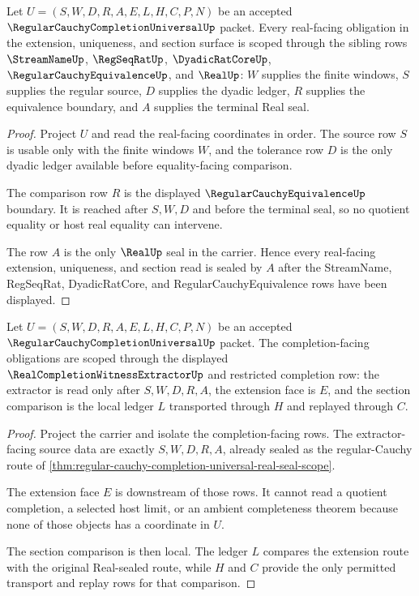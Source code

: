 \begin{theorem}
\label{thm:regular-cauchy-completion-universal-real-seal-scope}
Let $U=(S,W,D,R,A,E,L,H,C,P,N)$ be an accepted $\RegularCauchyCompletionUniversalUp$ packet. Every real-facing obligation in the extension, uniqueness, and section surface is scoped through the sibling rows $\StreamNameUp$, $\RegSeqRatUp$, $\DyadicRatCoreUp$, $\RegularCauchyEquivalenceUp$, and $\RealUp$: $W$ supplies the finite windows, $S$ supplies the regular source, $D$ supplies the dyadic ledger, $R$ supplies the equivalence boundary, and $A$ supplies the terminal Real seal.
\end{theorem}
\begin{proof}
Project $U$ and read the real-facing coordinates in order. The source row $S$ is usable only with the finite windows $W$, and the tolerance row $D$ is the only dyadic ledger available before equality-facing comparison.

The comparison row $R$ is the displayed $\RegularCauchyEquivalenceUp$ boundary. It is reached after $S,W,D$ and before the terminal seal, so no quotient equality or host real equality can intervene.

The row $A$ is the only $\RealUp$ seal in the carrier. Hence every real-facing extension, uniqueness, and section read is sealed by $A$ after the StreamName, RegSeqRat, DyadicRatCore, and RegularCauchyEquivalence rows have been displayed.
\end{proof}

\begin{theorem}
\label{thm:regular-cauchy-completion-universal-completion-extractor-scope}
Let $U=(S,W,D,R,A,E,L,H,C,P,N)$ be an accepted $\RegularCauchyCompletionUniversalUp$ packet. The completion-facing obligations are scoped through the displayed $\RealCompletionWitnessExtractorUp$ and restricted completion row: the extractor is read only after $S,W,D,R,A$, the extension face is $E$, and the section comparison is the local ledger $L$ transported through $H$ and replayed through $C$.
\end{theorem}
\begin{proof}
Project the carrier and isolate the completion-facing rows. The extractor-facing source data are exactly $S,W,D,R,A$, already sealed as the regular-Cauchy route of \autoref{thm:regular-cauchy-completion-universal-real-seal-scope}.

The extension face $E$ is downstream of those rows. It cannot read a quotient completion, a selected host limit, or an ambient completeness theorem because none of those objects has a coordinate in $U$.

The section comparison is then local. The ledger $L$ compares the extension route with the original Real-sealed route, while $H$ and $C$ provide the only permitted transport and replay rows for that comparison.
\end{proof}


